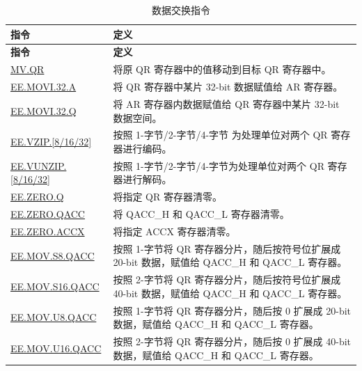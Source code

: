 \begin{longtable}[c]{|l|m{11cm}|}
    \caption{数据交换指令}
    \label{tab:pie-data-exchange-instructions}\\
    \hline
    \rowcolor{lightgray}
        \textbf{指令} & \textbf{定义} \\\hline
    \endfirsthead
    \rowcolor{lightgray}
    \textbf{指令} & \textbf{定义} \\\hline
    \endhead
    \endfoot
    \hyperref[instruction:MVQR]{MV.QR} & 将原 QR 寄存器中的值移动到目标 QR 寄存器中。
    \\\hline
    \hyperref[instruction:EEMOVI32A]{EE.MOVI.32.A} & 将 QR 寄存器中某片 32-bit 数据赋值给 AR 寄存器。
    \\\hline
    \hyperref[instruction:EEMOVI32Q]{EE.MOVI.32.Q} & 将 AR 寄存器内数据赋值给 QR 寄存器中某片 32-bit 数据空间。
    \\\hline
    \hyperref[instruction:EEVZIP8]{EE.VZIP.[8/16/32]} & 按照 1-字节/2-字节/4-字节 为处理单位对两个 QR 寄存器进行编码。
    \\\hline
    \hyperref[instruction:EEVUNZIP8]{EE.VUNZIP.[8/16/32]} & 按照 1-字节/2-字节/4-字节为处理单位对两个 QR 寄存器进行解码。
    \\\hline
    \hyperref[instruction:EEZEROQ]{EE.ZERO.Q} & 将指定 QR 寄存器清零。
    \\\hline
    \hyperref[instruction:EEZEROQACC]{EE.ZERO.QACC} & 将 QACC\_H 和 QACC\_L 寄存器清零。
    \\\hline
    \hyperref[instruction:EEZEROACCX]{EE.ZERO.ACCX} & 将指定 ACCX 寄存器清零。
    \\\hline
    \hyperref[instruction:EEMOVS8QACC]{EE.MOV.S8.QACC} & 按照 1-字节将 QR 寄存器分片，随后按符号位扩展成 20-bit 数据，赋值给 QACC\_H 和 QACC\_L 寄存器。
    \\\hline
    \hyperref[instruction:EEMOVS16QACC]{EE.MOV.S16.QACC} & 按照 2-字节将 QR 寄存器分片，随后按符号位扩展成 40-bit 数据，赋值给 QACC\_H 和 QACC\_L 寄存器。
    \\\hline
    \hyperref[instruction:EEMOVU8QACC]{EE.MOV.U8.QACC} & 按照 1-字节将 QR 寄存器分片，随后按 0 扩展成 20-bit 数据，赋值给 QACC\_H 和 QACC\_L 寄存器。
    \\\hline
    \hyperref[instruction:EEMOVU16QACC]{EE.MOV.U16.QACC} & 按照 2-字节将 QR 寄存器分片，随后按 0 扩展成 40-bit 数据，赋值给 QACC\_H 和 QACC\_L 寄存器。
    \\\hline
\end{longtable}